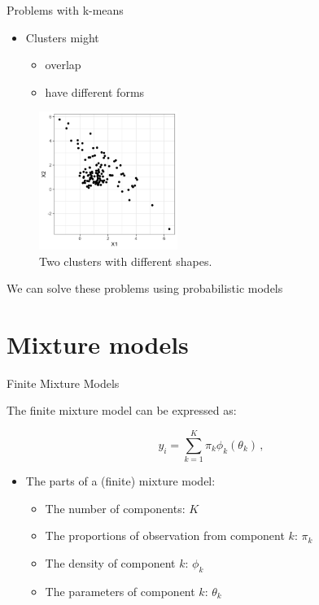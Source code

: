 \documentclass[10pt]{beamer}
\begin{document}
\begin{frame}{Problems with k-means}

\begin{itemize}
\item Clusters might
\begin{itemize}
\item overlap
\item have different forms
\end{itemize}
\end{itemize}

\begin{figure}[h]
\centering
\includegraphics[width=0.4\textwidth]{fig/mix_models.png}
\caption{Two clusters with different shapes.}
\end{figure}

\pause
We can solve these problems using {\color{uured} probabilistic models}

\end{frame}

\section{Mixture models}
\frame{\sectionpage}

\begin{frame}{Finite Mixture Models}

The {\color{uured} finite mixture model} can be expressed as:

\[
y_i = \sum_{k=1}^K \pi_k \phi_k(\theta_k)\,,
\]

\begin{itemize}
\item The parts of a (finite) mixture model:
\begin{itemize}
\item The number of components: $K$\pause
\item The proportions of observation from component $k$: $\pi_k$\pause
\item The density of component $k$: $\phi_k$\pause
\item The parameters of component $k$: $\theta_k$
\end{itemize}
\end{itemize}

\end{frame}
\end{document}
